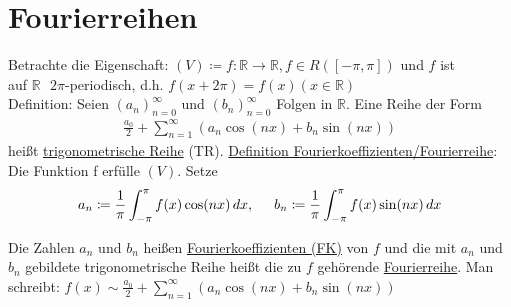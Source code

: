 \section{Fourierreihen}
Betrachte die Eigenschaft: $(V) \coloneqq f: \mathbb{R} \to \mathbb{R}, f \in R([-\pi,\pi])$ und $f$ ist \\
auf $\mathbb{R} \text{ }2\pi$-periodisch, d.h. $f(x+2\pi) = f(x) (x \in \mathbb{R})$ \\

Definition: Seien $(a_n)_{n=0}^{\infty}$ und $(b_n)_{n=0}^{\infty}$ Folgen in $\mathbb{R}$. Eine Reihe der Form
\begin{align*}
    \frac{a_0}{2} + \sum \limits_{n=1}^{\infty} (a_n \cos (nx) + b_n \sin (nx))
\end{align*}
heißt \underline{trigonometrische Reihe} (TR). 
\newpage 
\underline{Definition Fourierkoeffizienten/Fourierreihe}:
Die Funktion f erfülle $(V)$. Setze 
\begin{align*}
    a_n \coloneqq \frac{1}{\pi} \int_{-\pi}^{\pi} f(x) \cos(nx)\,dx, \hspace{0.5cm}b_n \coloneqq \frac{1}{\pi} \int_{-\pi}^{\pi} f(x) \sin(nx)\,dx
\end{align*}

Die Zahlen $a_n$ und $b_n$ heißen \underline{Fourierkoeffizienten (FK)} von $f$ und die mit $a_n$ und $b_n$ gebildete trigonometrische Reihe heißt die zu $f$
gehörende \underline{Fourierreihe}. Man schreibt: $f(x) \sim \frac{a_0}{2} + \sum \limits_{n=1}^{\infty} (a_n \cos(nx) + b_n \sin(nx))$

